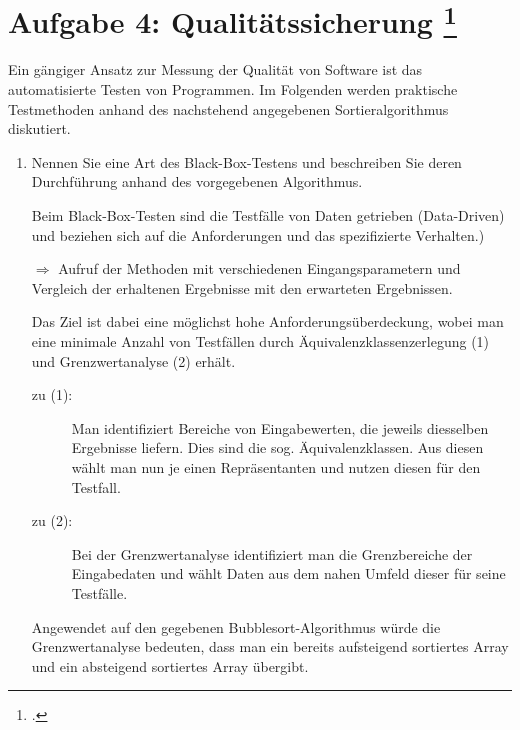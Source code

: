 \documentclass{lehramt-informatik-minimal}
\begin{document}
\section{Aufgabe 4: Qualitätssicherung
\footcite{examen:46116:2017:09}
}

Ein gängiger Ansatz zur Messung der Qualität von Software ist das
automatisierte Testen von Programmen. Im Folgenden werden praktische
Testmethoden anhand des nachstehend angegebenen Sortieralgorithmus
diskutiert.



\begin{enumerate}


\item Nennen Sie eine Art des Black-Box-Testens
und beschreiben Sie deren Durchführung anhand des vorgegebenen
Algorithmus.

\begin{antwort}
Beim Black-Box-Testen sind die Testfälle von Daten getrieben
(Data-Driven) und beziehen sich auf die Anforderungen und das
spezifizierte Verhalten.)

$\Rightarrow$ Aufruf der Methoden mit verschiedenen
Eingangsparametern und Vergleich der erhaltenen Ergebnisse mit den
erwarteten Ergebnissen.

Das Ziel ist dabei eine möglichst hohe
Anforderungsüberdeckung, wobei man eine
minimale Anzahl von Testfällen durch
Äquivalenzklassenzerlegung (1) und
Grenzwertanalyse (2) erhält.

\begin{description}
\item[zu (1):] Man identifiziert Bereiche von Eingabewerten, die jeweils
diesselben Ergebnisse liefern. Dies sind die sog. Äquivalenzklassen. Aus
diesen wählt man nun je einen Repräsentanten und nutzen diesen für den
Testfall.

\item[zu (2):] Bei der Grenzwertanalyse identifiziert man die
Grenzbereiche der Eingabedaten und wählt Daten aus dem nahen Umfeld
dieser für seine Testfälle.
\end{description}

Angewendet auf den gegebenen Bubblesort-Algorithmus würde die
Grenzwertanalyse bedeuten, dass man ein bereits aufsteigend sortiertes
Array und ein absteigend sortiertes Array übergibt.
\end{antwort}


\end{enumerate}
\end{document}
